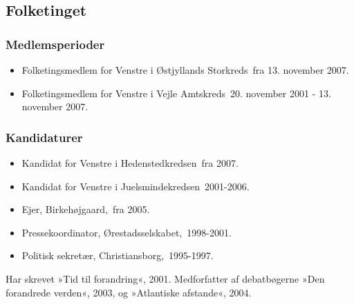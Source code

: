 \documentclass[11pt, a4paper]{awesome-cv}
\begin{document}
\begin{cvletter}
\subsection*{Folketinget}
\subsubsection*{Medlemsperioder}
\begin{itemize}
\item Folketingsmedlem for Venstre i Østjyllands Storkreds fra 13. november 2007.
\item Folketingsmedlem for Venstre i Vejle Amtskreds 20. november 2001 - 13. november 2007.
\end{itemize}
\subsubsection*{Kandidaturer}
\begin{itemize}
\item Kandidat for Venstre i Hedenstedkredsen fra 2007.
\item Kandidat for Venstre i Juelsmindekredsen 2001-2006.
\end{itemize}
\begin{itemize}
\item Ejer, Birkehøjgaard, fra 2005.
\item Pressekoordinator, Ørestadsselskabet, 1998-2001.
\item Politisk sekretær, Christiansborg, 1995-1997.
\end{itemize}
Har skrevet »Tid til forandring«, 2001. Medforfatter af debatbøgerne »Den forandrede verden«, 2003, og »Atlantiske afstande«, 2004.

\end{cvletter}
\end{document}
